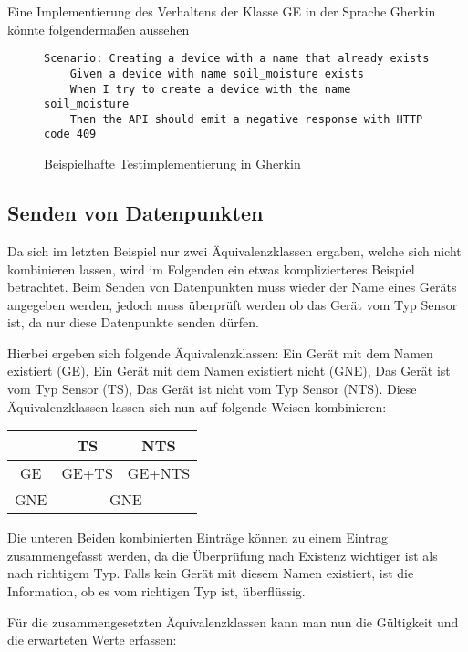 Eine Implementierung des Verhaltens der Klasse GE in der Sprache Gherkin könnte folgendermaßen aussehen
\begin{figure}[H]
    \begin{verbatim}
Scenario: Creating a device with a name that already exists    
    Given a device with name soil_moisture exists
    When I try to create a device with the name soil_moisture
    Then the API should emit a negative response with HTTP code 409
    \end{verbatim}
    \label{lst:test_create}
    \caption{Beispielhafte Testimplementierung in Gherkin}
\end{figure}

\subsection{Senden von Datenpunkten}
Da sich im letzten Beispiel nur zwei Äquivalenzklassen ergaben, welche sich nicht kombinieren lassen, wird im Folgenden ein etwas komplizierteres Beispiel betrachtet.
Beim Senden von Datenpunkten muss wieder der Name eines Geräts angegeben werden, jedoch muss überprüft werden ob das Gerät vom Typ Sensor ist, da nur diese Datenpunkte senden dürfen. 

Hierbei ergeben sich folgende Äquivalenzklassen: Ein Gerät mit dem Namen existiert (GE), Ein Gerät mit dem Namen existiert nicht (GNE), Das Gerät ist vom Typ Sensor (TS), Das Gerät ist nicht vom Typ Sensor (NTS).
Diese Äquivalenzklassen lassen sich nun auf folgende Weisen kombinieren:

\begin{center}
    \begin{tabular}{c||c|c}
        &TS&NTS\\
        \hline
        \hline
        GE&GE+TS&GE+NTS\\
        \hline
        GNE& \multicolumn{2}{c}{GNE}\\
    \end{tabular}
\end{center}

Die unteren Beiden kombinierten Einträge können zu einem Eintrag zusammengefasst werden, da die Überprüfung nach Existenz wichtiger ist als nach richtigem Typ.
Falls kein Gerät mit diesem Namen existiert, ist die Information, ob es vom richtigen Typ ist, überflüssig.

Für die zusammengesetzten Äquivalenzklassen kann man nun die Gültigkeit und die erwarteten Werte erfassen:

